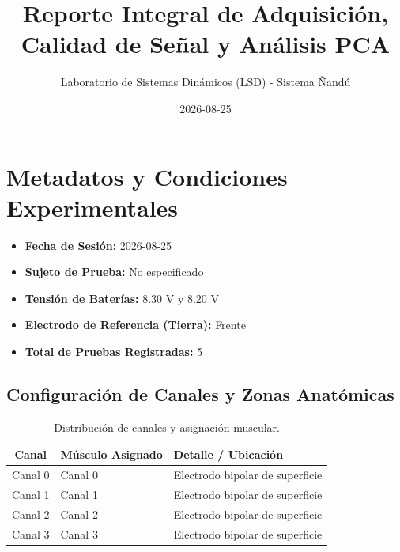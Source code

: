 \documentclass[11pt,a4paper]{article}
\title{\textbf{Reporte Integral de Adquisición, Calidad de Señal y Análisis PCA}}
\author{Laboratorio de Sistemas Dinámicos (LSD) - Sistema Ñandú}
\date{2026-08-25}
\begin{document}
\maketitle

\section{Metadatos y Condiciones Experimentales}
\begin{itemize}
    \item \textbf{Fecha de Sesión:} 2026-08-25
    \item \textbf{Sujeto de Prueba:} No especificado
    \item \textbf{Tensión de Baterías:} 8.30 V y 8.20 V
    \item \textbf{Electrodo de Referencia (Tierra):} Frente
    \item \textbf{Total de Pruebas Registradas:} 5
\end{itemize}

\subsection{Configuración de Canales y Zonas Anatómicas}
\begin{table}[H]
\centering
\begin{tabular}{clp{9cm}}
\toprule
\textbf{Canal} & \textbf{Músculo Asignado} & \textbf{Detalle / Ubicación} \\
\midrule
Canal 0 & Canal 0 & Electrodo bipolar de superficie \\
Canal 1 & Canal 1 & Electrodo bipolar de superficie \\
Canal 2 & Canal 2 & Electrodo bipolar de superficie \\
Canal 3 & Canal 3 & Electrodo bipolar de superficie \\
\bottomrule
\end{tabular}
\caption{Distribución de canales y asignación muscular.}
\end{table}
\end{document}
